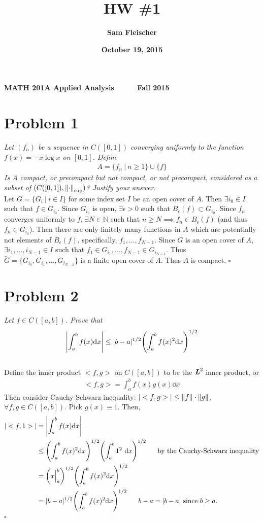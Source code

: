 \documentclass[12pt]{article}
\title{\bf HW \#1}
\author{\bf Sam Fleischer}
\date{\bf October 19, 2015}
\begin{document}
{\bf MATH 201A \hfill Applied Analysis \ \ \ \ \ \hfill Fall 2015} 

{\let\newpage\relax\maketitle}

\section*{Problem 1}
\emph{Let $(f_n)$ be a sequence in $C([0,1])$ converging uniformly to the function $f(x) = -x\log x$ on $[0,1]$.  Define}
\begin{align*}
	A = \{f_n\ |\ n \geq 1\}\cup\{f\}
\end{align*}
\emph{Is A compact, or precompact but not compact, or not precompact, considered as a subset of $(C([0,1]), \norm{\cdot}_{\text{sup}})$?  Justify your answer.} \\

Let $G = \{G_i\ |\ i\in I\}$ for some index set $I$ be an open cover of $A$.  Then $\exists i_0 \in I$ such that $f \in G_{i_0}$.  Since $G_{i_0}$ is open, $\exists \epsilon > 0$ such that $B_\epsilon(f) \subset G_{i_0}$.  Since $f_n$ converges uniformly to $f$, $\exists N\in\mathbb{N}$ such that $n \geq N \implies f_n\in B_\epsilon(f)$ (and thus $f_n \in G_{i_0}$).  Then there are only finitely many functions in $A$ which are potentially not elements of $B_\epsilon(f)$, specifically, $f_1,\dots, f_{N-1}$.  Since $G$ is an open cover of $A$, $\exists i_{1}, \dots, i_{N-1} \in I$ such that $f_1 \in G_{i_1}, \dots, f_{N-1} \in G_{i_{N-1}}$.  Thus $\widetilde{G} = \{G_{i_0}, G_{i_1}, \dots, G_{i_{N-1}}\}$ is a finite open cover of $A$.  Thus $A$ is compact. \hfill $\square$

\section*{Problem 2}
\emph{Let $f \in C([a,b])$.  Prove that}
\begin{equation*}
	\left|\int_a^b f(x) \dd x\right| \leq |b - a|^{1/2}\qty(\int_a^b f(x)^2 \dd x)^{1/2}
\end{equation*} \\

Define the inner product $<f,g>$ on $C([a,b])$ to be the $\textbf{\emph{L}}^2$ inner product, or
\begin{align*}
	<f,g> = \int_a^b f(x) g(x) \dd x
\end{align*}
Then consider Cauchy-Schwarz inequality: $|<f,g>| \leq \norm{f}\cdot\norm{g}$, $\forall f, g \in C([a,b])$.  Pick $g(x) \equiv 1$.  Then,
\begin{align*}
	|<f,1>| &= \left|\int_a^b f(x) \dd x\right|\\
	&\leq \qty(\int_a^b f(x)^2\dd x)^{1/2}\qty(\int_a^b 1^2\ \dd x)^{1/2}\ \ \ \ \ \text{by the Cauchy-Schwarz inequality} \\
	&= \qty(x\Big|_a^b)^{1/2} \qty(\int_a^b f(x)^2\dd x)^{1/2}\\
	&= |b - a|^{1/2}\qty(\int_a^b f(x)^2\dd x)^{1/2}\ \ \ \ \ \text{$b - a = |b - a|$ since $b \geq a$.}
\end{align*}\hfill $\square$
\end{document}
